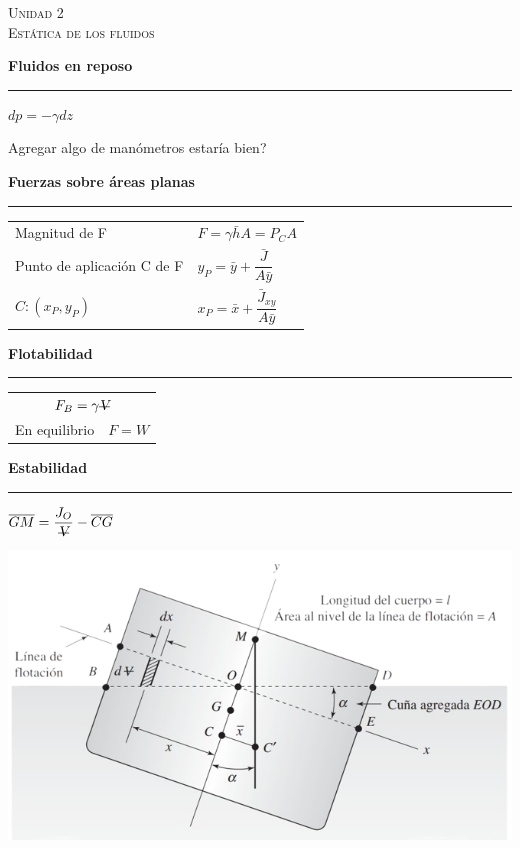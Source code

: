 \documentclass[11pt,a4paper]{article}
\newcommand{\unidad}[2]{\begin{center}
		\fontsize{10}{10}\selectfont\color{gray!50!black}\scshape Unidad #1 \\
		\fontsize{14}{14}\selectfont \scshape #2
	\end{center} \vspace{-.6cm}}
\newcommand{\subtitulo}[1]{
	\textbf{#1} \\ \vspace{.1cm} {\color{gray} \hrule} \vspace{.2cm}
}
\newcommand{\vdes}{\st{\textsl{V}}}
\begin{document}
	\unidad{2}{Estática de los fluidos}
		\begin{cajita}
			\centering
			\subtitulo{Fluidos en reposo}
			$dp = -\gamma dz$
			
			Agregar algo de manómetros estaría bien?
			
			\subtitulo{Fuerzas sobre áreas planas}
			
			\begin{tabular}{l l}
				Magnitud de F & $F = \gamma \bar{h} A = P_C A$\\
				Punto de aplicación C de F & $ y_P = \bar{y} + \dfrac{\bar{J}}{A \bar{y}}$\\
				$C:(x_P, y_P)$& $x_P = \bar{x} + \dfrac{\bar{J}_{xy}}{A \bar{y}}$\\
			\end{tabular}
		
			
		\begin{multicols}{2}
			\subtitulo{Flotabilidad}
			\begin{tabular}{l l}
				\multicolumn{2}{c}{$F_B = \gamma \vdes$}\\
				En equilibrio & $F=W$\\
			\end{tabular}
		
			\columnbreak
			
			\subtitulo{Estabilidad}
			
			$\overline{GM} = \dfrac{J_O}{\vdes} - \overline{CG}$
			
			
			\includegraphics[width=\linewidth]{estabilidad}
		\end{multicols}
		\end{cajita}
\end{document}
